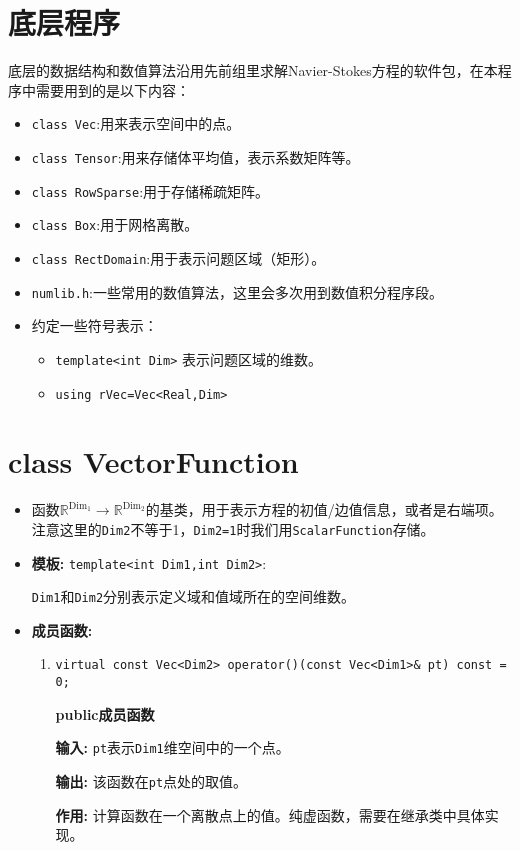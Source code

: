 \documentclass[UTF8]{ctexart}
\theoremstyle{plain}
\theoremstyle{definition}
\theoremstyle{remark}
\begin{document}
\section{底层程序}
底层的数据结构和数值算法沿用先前组里求解Navier-Stokes方程的软件包，在本程序中需要用到的是以下内容：
\begin{itemize}
    \item \texttt{class Vec}:用来表示空间中的点。
    \item \texttt{class Tensor}:用来存储体平均值，表示系数矩阵等。
    \item \texttt{class RowSparse}:用于存储稀疏矩阵。
    \item \texttt{class Box}:用于网格离散。
    \item \texttt{class RectDomain}:用于表示问题区域（矩形）。
    \item \texttt{numlib.h}:一些常用的数值算法，这里会多次用到数值积分程序段。
    \item 约定一些符号表示：
    \begin{itemize}
        \item \texttt{template<int Dim>} 表示问题区域的维数。
        \item \texttt{using rVec=Vec<Real,Dim>}
    \end{itemize}
\end{itemize}
\section{class VectorFunction}
\begin{itemize}
    \item 函数$\mathbb{R}^{\text{Dim}_{1}}\rightarrow\mathbb{R}^{\text{Dim}_{2}}$的基类，用于表示方程的初值/边值信息，或者是右端项。注意这里的\texttt{Dim2}不等于1，\texttt{Dim2=1}时我们用\texttt{ScalarFunction}存储。
    \item \textbf{模板:} \texttt{template<int Dim1,int Dim2>}:
    
    \texttt{Dim1}和\texttt{Dim2}分别表示定义域和值域所在的空间维数。
    \item \textbf{成员函数:}
    \begin{enumerate}
    \item \texttt{virtual const Vec<Dim2> operator()(const Vec<Dim1>\& pt) const = 0;}

      \textbf{public成员函数}

      \textbf{输入:} \texttt{pt}表示\texttt{Dim1}维空间中的一个点。

      \textbf{输出:} 该函数在\texttt{pt}点处的取值。

      \textbf{作用:} 计算函数在一个离散点上的值。纯虚函数，需要在继承类中具体实现。
    \end{enumerate}
\end{itemize}
\end{document}
